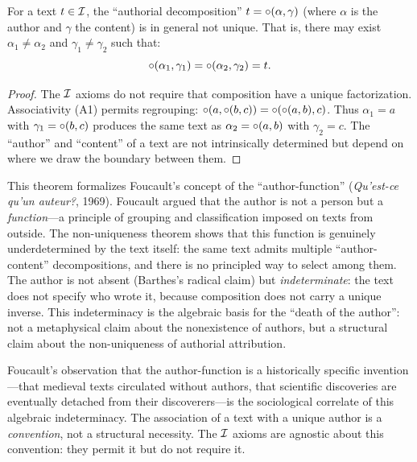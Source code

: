 \begin{theorem}
\label{thm:author-non-unique}
For a text $t \in \mathcal{I}$, the ``authorial decomposition'' $t = \circ(\alpha, \gamma)$ (where $\alpha$ is the author and $\gamma$ the content) is in general not unique. That is, there may exist $\alpha_1 \neq \alpha_2$ and $\gamma_1 \neq \gamma_2$ such that:
\[
  \circ(\alpha_1, \gamma_1) = \circ(\alpha_2, \gamma_2) = t.
\]
\end{theorem}

\begin{proof}
The $\mathcal{I}$ axioms do not require that composition have a unique factorization. Associativity (A1) permits regrouping: $\circ(a, \circ(b, c)) = \circ(\circ(a, b), c)$. Thus $\alpha_1 = a$ with $\gamma_1 = \circ(b, c)$ produces the same text as $\alpha_2 = \circ(a, b)$ with $\gamma_2 = c$. The ``author'' and ``content'' of a text are not intrinsically determined but depend on where we draw the boundary between them.
\end{proof}

\begin{interpretation}
This theorem formalizes Foucault's concept of the ``author-function'' (\textit{Qu'est-ce qu'un auteur?}, 1969). Foucault argued that the author is not a person but a \emph{function}---a principle of grouping and classification imposed on texts from outside. The non-uniqueness theorem shows that this function is genuinely underdetermined by the text itself: the same text admits multiple ``author-content'' decompositions, and there is no principled way to select among them. The author is not absent (Barthes's radical claim) but \emph{indeterminate}: the text does not specify who wrote it, because composition does not carry a unique inverse. This indeterminacy is the algebraic basis for the ``death of the author'': not a metaphysical claim about the nonexistence of authors, but a structural claim about the non-uniqueness of authorial attribution.

Foucault's observation that the author-function is a historically specific invention---that medieval texts circulated without authors, that scientific discoveries are eventually detached from their discoverers---is the sociological correlate of this algebraic indeterminacy. The association of a text with a unique author is a \emph{convention}, not a structural necessity. The $\mathcal{I}$ axioms are agnostic about this convention: they permit it but do not require it.
\end{interpretation}

